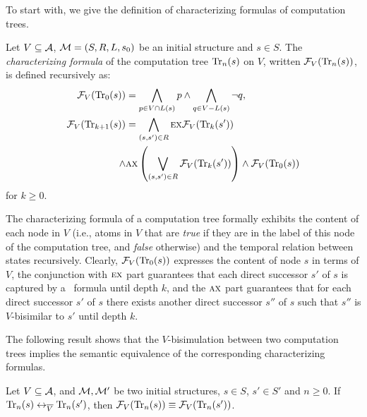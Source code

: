 \documentclass{article}
\begin{document}
To start with, we give the definition of characterizing formulas of computation trees.
\begin{definition}\label{def:V:char:formula}
Let $V\subseteq {\cal A}$, ${\cal M} =(S,R,L,s_0)$ be an initial structure and $s\in S$.
The {\em characterizing formula} of the computation tree $\textrm{Tr}_n(s)$ on $V$,
written ${\cal F}_V(\textrm{Tr}_n(s))$, is defined recursively as:
\begin{align*}
   {\cal F}_V(\textrm{Tr}_0(s)) &=  \bigwedge_{p \in V\cap L(s)}p
     \wedge \bigwedge_{q\in V-L(s)} \neg q,\\
   {\cal F}_V(\textrm{Tr}_{k+1}(s))& = \bigwedge_{(s,s')\in R}
    \textsc{e} \textsc{x} {\cal F}_V(\textrm{Tr}_k(s'))\\
  \wedge &
    \textsc{a} \textsc{x} \left( \bigvee_{(s,s')\in R} {\cal F}_V(\textrm{Tr}_k(s')) \right) \wedge {\cal F}_V(\textrm{Tr}_0(s))
\end{align*}
for $k\ge 0$.
\end{definition}
The characterizing formula of a computation tree formally exhibits the content of each node in $V$ (i.e., atoms in $V$ that are {\em true}  if they are in the label of this node of the computation tree, and {\em false} otherwise) and the temporal relation between states recursively.
Clearly, ${\cal F}_V(\textrm{Tr}_0(s))$ expresses the content of node $s$ in terms of $V$, the conjunction with $\textsc{e} \textsc{x}$ part guarantees that each direct successor $s'$ of $s$ is captured by a \CTL\ formula until depth $k$, and the $\textsc{a} \textsc{x}$ part guarantees that for each direct successor $s'$ of $s$ there exists another direct successor $s''$ of $s$ such that $s''$ is $V$-bisimilar to $s'$ until depth $k$.

The following result shows that the $V$-bisimulation between two computation trees implies the semantic equivalence of the corresponding characterizing formulas.

\begin{lemma}\label{lem:Vb:TrFormula:Equ}
Let $V\subseteq {\cal A}$, and ${\cal M}, {\cal M}'$ be two initial structures,
$s\in S$, $s'\in S'$ and $n\ge 0$. If $\textrm{Tr}_n(s) \leftrightarrow_{\overline V} \textrm{Tr}_n(s')$, then ${\cal F}_V(\textrm{Tr}_n(s)) \equiv {\cal F}_V(\textrm{Tr}_n(s'))$.
\end{lemma}

\end{document}
